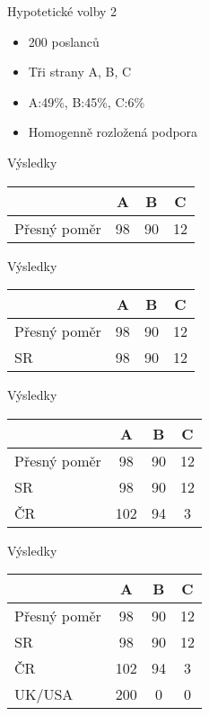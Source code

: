 \documentclass[17pt]{beamer}
\begin{document}
\begin{frame}{Hypotetické volby 2}
\begin{itemize}
\item 200 poslanců
\item Tři strany A, B, C
\item A:49\%, B:45\%, C:6\%
\item Homogenně rozložená podpora
\end{itemize}
\end{frame}

\begin{frame}{Výsledky}
\begin{center}
\begin{tabular}{|l|c|c|c|} \hline
  & A & B & C \\ \hline 
Přesný poměr & 98 & 90 & 12\\ \hline
\end{tabular}
\end{center} 
\end{frame}

\begin{frame}{Výsledky}
\begin{center}
\begin{tabular}{|l|c|c|c|} \hline
  & A & B & C \\ \hline 
Přesný poměr & 98 & 90 & 12\\ \hline
SR & 98 & 90 & 12\\ \hline
\end{tabular}
\end{center} 
\end{frame}

\begin{frame}{Výsledky}
\begin{center}
\begin{tabular}{|l|c|c|c|} \hline
  & A & B & C \\ \hline 
Přesný poměr & 98 & 90 & 12\\ \hline
SR & 98 & 90 & 12\\ \hline
ČR & 102 & 94 & 3\\ \hline
\end{tabular}
\end{center} 
\end{frame}

\begin{frame}{Výsledky}
\begin{center}
\begin{tabular}{|l|c|c|c|} \hline
  & A & B & C \\ \hline 
Přesný poměr & 98 & 90 & 12\\ \hline
SR & 98 & 90 & 12\\ \hline
ČR & 102 & 94 & 3\\ \hline
UK/USA & 200 & 0 & 0\\ \hline
\end{tabular}
\end{center} 
\end{frame}
\end{document}
